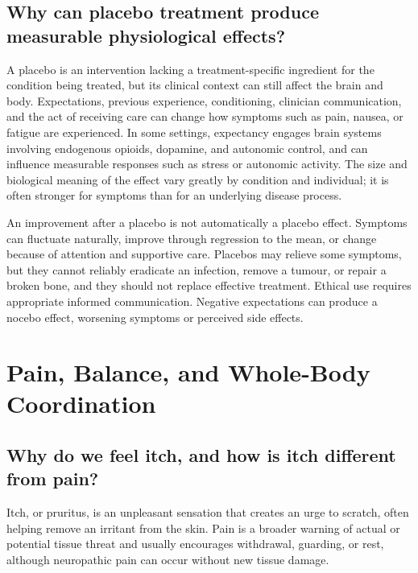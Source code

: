 \documentclass[11pt,oneside]{report}
\begin{document}
\section{Why can placebo treatment produce measurable physiological effects?}

A placebo is an intervention lacking a treatment-specific ingredient for the
condition being treated, but its clinical context can still affect the brain
and body. Expectations, previous experience, conditioning, clinician
communication, and the act of receiving care can change how symptoms such as
pain, nausea, or fatigue are experienced. In some settings, expectancy engages
brain systems involving endogenous opioids, dopamine, and autonomic control,
and can influence measurable responses such as stress or autonomic activity.
The size and biological meaning of the effect vary greatly by condition and
individual; it is often stronger for symptoms than for an underlying disease
process.

An improvement after a placebo is not automatically a placebo effect. Symptoms
can fluctuate naturally, improve through regression to the mean, or change
because of attention and supportive care. Placebos may relieve some symptoms,
but they cannot reliably eradicate an infection, remove a tumour, or repair a
broken bone, and they should not replace effective treatment. Ethical use
requires appropriate informed communication. Negative expectations can produce
a nocebo effect, worsening symptoms or perceived side effects.

\chapter{Pain, Balance, and Whole-Body Coordination}

\section{Why do we feel itch, and how is itch different from pain?}

Itch, or pruritus, is an unpleasant sensation that creates an urge to scratch,
often helping remove an irritant from the skin. Pain is a broader warning of
actual or potential tissue threat and usually encourages withdrawal, guarding,
or rest, although neuropathic pain can occur without new tissue damage.
\end{document}
